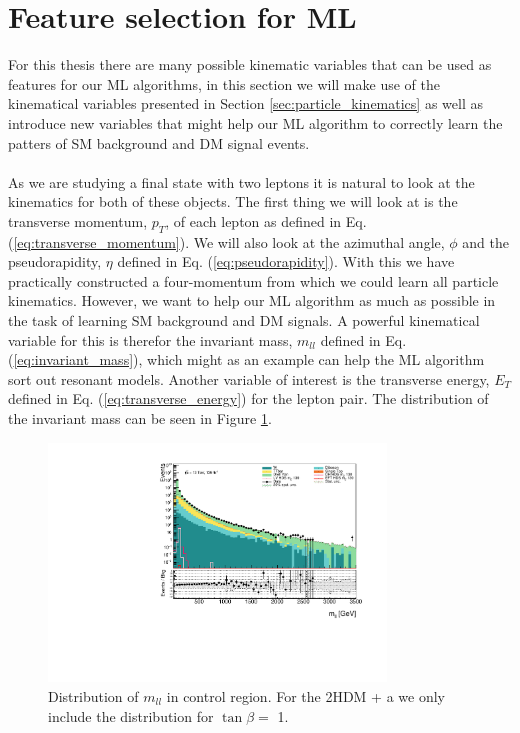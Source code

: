 \documentclass[12pt, a4paper]{book}
\begin{document}
\section{Feature selection for ML}
For this thesis there are many possible kinematic variables that can be used as features for our ML algorithms, in this section we will make use of the kinematical variables presented in Section \ref{sec:particle_kinematics} as well as introduce new variables that 
might help our ML algorithm to correctly learn the patters of SM background and DM signal events. \\
\\As we are studying a final state with two leptons it is natural to look at the kinematics for both of these objects. The first thing we will look at is the transverse momentum, $p_T$, of each lepton as defined in Eq. (\ref{eq:transverse_momentum}). 
We will also look at the azimuthal angle, $\phi$ and the pseudorapidity, $\eta$ defined in Eq. (\ref{eq:pseudorapidity}). 
With this we have practically constructed a four-momentum from which we could learn all particle kinematics. However, we want to help our ML algorithm as much as possible in the task of learning SM background and DM signals. A powerful kinematical variable for this is 
therefor the invariant mass, $m_{ll}$ defined in Eq. (\ref{eq:invariant_mass}), which might as an example can help the ML algorithm sort out resonant models. Another variable of interest is the transverse energy, $E_T$ defined in Eq. (\ref{eq:transverse_energy}) for the lepton pair. 
The distribution of the invariant mass can be seen in Figure \ref{fig:mll_dist}.\\
\graphicspath{{../../../Plots/Data_Analysis/SRs/Control_region/}} 
\begin{figure}[!ht]
    \centering
        \includegraphics[width=0.8\textwidth]{mll.pdf}
    \caption{Distribution of $m_{ll}$ in control region.  For the 2HDM + a we only include the distribution for $\tan\beta=$ 1.}\label{fig:mll_dist}
\end{figure}
\end{document}
